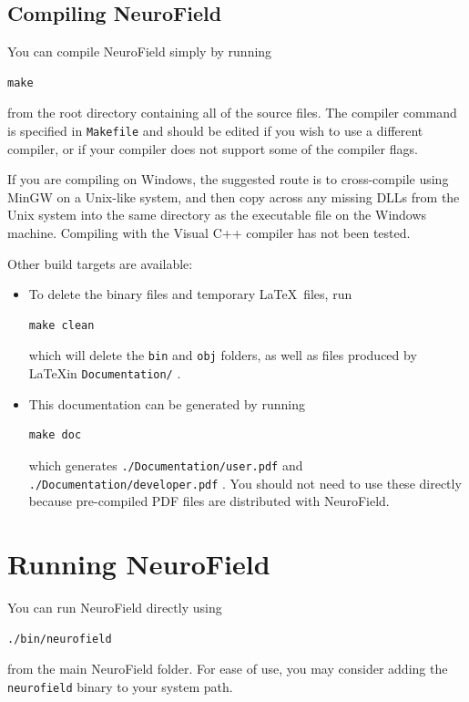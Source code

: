 \documentclass[12pt,a4paper]{article}
\newcommand{\type}[1]{ {\small\small\tt #1} }
\begin{document}
\subsection{Compiling NeuroField} %
\label{sec:compiling}
You can compile NeuroField simply by running 

\begin{lstlisting}
make
\end{lstlisting}

from the root directory containing all of the source files. The compiler command is specified in \type{Makefile} and should be edited if you wish to use a different compiler, or if your compiler does not support some of the compiler flags.

If you are compiling on Windows, the suggested route is to cross-compile using MinGW on a Unix-like system, and then copy across any missing DLLs from the Unix system into the same directory as the executable file on the Windows machine. Compiling with the Visual C++ compiler has not been tested.

Other build targets are available:
\begin{itemize}
\item To delete the binary files and temporary \LaTeX\ files, run
\begin{lstlisting}
make clean
\end{lstlisting}
which will delete the \type{bin} and \type{obj} folders, as well as files produced by \LaTeX in \type{Documentation/}.
\item This documentation can be generated by running 
\begin{lstlisting}
make doc
\end{lstlisting}
which generates \type{./Documentation/user.pdf} and \type{./Documentation/developer.pdf}. You should not need to use these directly because pre-compiled PDF files are distributed with NeuroField. 
\end{itemize}

\section{Running NeuroField}
\label{sec:running}
You can run NeuroField directly using

\begin{lstlisting}
./bin/neurofield
\end{lstlisting}

from the main NeuroField folder. For ease of use, you may consider adding the \type{neurofield} binary to your system path. 
\end{document}
